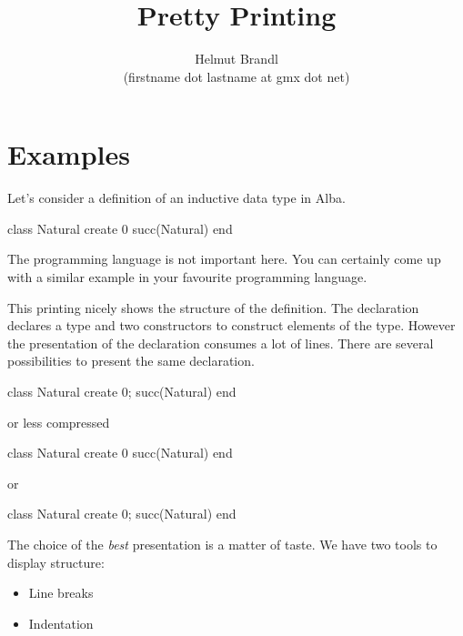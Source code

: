 \documentclass[12pt]{article}
\begin{document}
\title{Pretty Printing}
\author{Helmut Brandl \\ \scriptsize (firstname dot lastname at gmx dot net)}
\date{}

\maketitle

\abstract{ }


\tableofcontents







\section{Examples}


Let's consider a definition of an inductive data type in Alba.
\begin{alba}
    class
        Natural
    create
        0
        succ(Natural)
    end
\end{alba}
%
The programming language is not important here. You can certainly come up with
a similar example in your favourite programming language.

This printing nicely shows the structure of the definition. The declaration
declares a type and two constructors to construct elements of the
type. However the presentation of the declaration consumes a lot of lines.
There are several possibilities to present the same declaration.
%
\begin{alba}
    class Natural create 0; succ(Natural) end
\end{alba}
%
or less compressed
\begin{alba}
    class Natural create
        0
        succ(Natural)
    end
\end{alba}
%
or
%
\begin{alba}
    class Natural create
        0; succ(Natural)
    end
\end{alba}
%
%
The choice of the \emph{best} presentation is a matter of taste.  We have two
tools to display structure:
\begin{itemize}
\item Line breaks
\item Indentation
\end{itemize}
\end{document}
